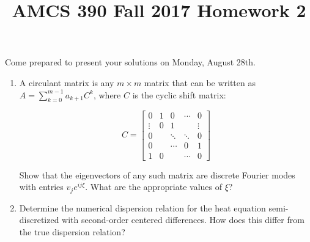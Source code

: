 \documentclass[12pt]{article}
\title{AMCS 390 Fall 2017 Homework 2}
\begin{document}
\date{}
\maketitle

Come prepared to present your solutions on Monday, August 28th.
\begin{enumerate}

    \item   A circulant matrix is any $m\times m$ matrix that can be written as
            $A=\sum_{k=0}^{m-1} a_{k+1}C^k$, where $C$ is the cyclic shift matrix:

            $$C = \begin{bmatrix} 0 & 1 & 0 & \cdots & 0 \\ \vdots & 0 & 1 & & \vdots \\
              0 & & \ddots & \ddots & 0  \\ 0 & & \cdots & 0 & 1\\ 1 & 0 & & \cdots & 0\end{bmatrix}$$

            Show that the eigenvectors of any such matrix are discrete Fourier modes
            with entries $v_j e^{ij\xi}$.  What are the appropriate values of $\xi$?

    \item   Determine the numerical dispersion relation for the heat equation semi-discretized with
            second-order centered differences.  How does this differ from the true dispersion
            relation?

\end{enumerate}
\end{document}
